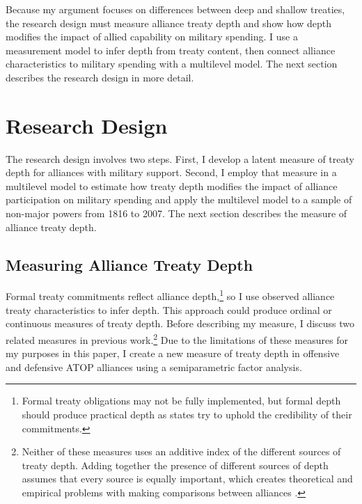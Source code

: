 \documentclass[12pt]{article}
\begin{document}
Because my argument focuses on differences between deep and shallow treaties, the research design must measure alliance treaty depth and show how depth modifies the impact of allied capability on military spending.  
I use a measurement model to infer depth from treaty content, then connect alliance characteristics to military spending with a multilevel model. 
The next section describes the research design in more detail. 



\section{Research Design} 


The research design involves two steps. 
First, I develop a latent measure of treaty depth for alliances with military support. 
Second, I employ that measure in a multilevel model to estimate how treaty depth modifies the impact of alliance participation on military spending and apply the multilevel model to a sample of non-major powers from 1816 to 2007. 
The next section describes the measure of alliance treaty depth. 


\subsection{Measuring Alliance Treaty Depth} 


Formal treaty commitments reflect alliance depth,\footnote{Formal treaty obligations may not be fully implemented, but formal depth should produce practical depth as states try to uphold the credibility of their commitments.} so I use observed alliance treaty characteristics to infer depth. 
This approach could produce ordinal or continuous measures of treaty depth.
Before describing my measure, I discuss two related measures in previous work.\footnote{Neither of these measures uses an additive index of the different sources of treaty depth. Adding together the presence of different sources of depth assumes that every source is equally important, which creates theoretical and empirical problems with making comparisons between alliances \citep[pg. 876]{BensonClinton2016}.} 
Due to the limitations of these measures for my purposes in this paper, I create a new measure of treaty depth in offensive and defensive ATOP alliances using a semiparametric factor analysis. 
\end{document}

